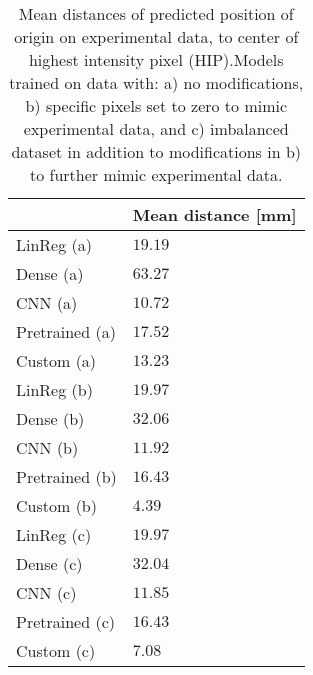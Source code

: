 \begin{table}
\centering
\caption{
Mean distances of predicted position of origin on experimental data, to center of highest intensity pixel (HIP).Models 
trained on data with: a) no modifications, b) specific pixels set to zero to mimic experimental data, and c) imbalanced dataset
in addition to modifications in b) to further mimic experimental data.
}
\label{tab:regression-experimental-dist-means}
\begin{tabular}{ll}
\toprule
{} & Mean distance [mm] \\
\midrule
LinReg (a)     &  $\num{ 19.19 }$ \\
Dense (a)      &  $\num{ 63.27 }$ \\
CNN (a)        &  $\num{ 10.72 }$ \\
Pretrained (a) &  $\num{ 17.52 }$ \\
Custom (a)     &  $\num{ 13.23 }$ \\
LinReg (b)     &  $\num{ 19.97 }$ \\
Dense (b)      &  $\num{ 32.06 }$ \\
CNN (b)        &  $\num{ 11.92 }$ \\
Pretrained (b) &  $\num{ 16.43 }$ \\
Custom (b)     &  $\num{ 4.39 }$ \\
LinReg (c)     &  $\num{ 19.97 }$ \\
Dense (c)      &  $\num{ 32.04 }$ \\
CNN (c)        &  $\num{ 11.85 }$ \\
Pretrained (c) &  $\num{ 16.43 }$ \\
Custom (c)     &  $\num{ 7.08 }$ \\
\bottomrule
\end{tabular}
\end{table}
